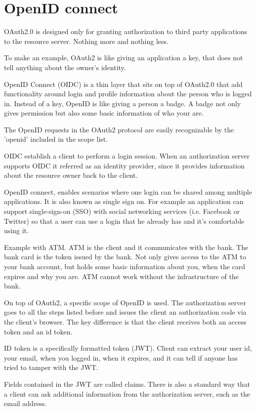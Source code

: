 \documentclass[11pt]{style}
\begin{document}
\section{OpenID connect}
\label{openid}
OAuth2.0 is designed only for granting authorization to third party applications
to the resource server. Nothing more and nothing less.

To make an example, OAuth2 is like giving an application a key, that does not
tell anything about the owner's identity.

OpenID Connect (OIDC) is a thin layer that sits on top of OAuth2.0 that add functionality around
login and profile information about the person who is logged in.
Instead of a key, OpenID is like giving a person a badge. A badge not only gives
permission but also some basic information of who your are.

The OpenID requests in the OAuth2 protocol are easily recognizable by the
'openid' included in the scope list.

OIDC establish a client to perform a login session.
When an authorization server supports OIDC it referred as an identity provider,
since it provides information about the resource owner back to the client.

OpenID connect, enables scenarios where one login can be shared among multiple
applications. It is also known as single sign on.
For example an application can support single-sign-on (SSO) with social networking services (i.e.
Facebook or Twitter) so that a user can use a login that he already has and it's
comfortable using it.

Example with ATM. ATM is the client and it communicates with the bank. The bank
card is the token issued by the bank. Not only gives access to the ATM to your
bank account, but holds some basic information about you, when the card expires
and why you are.
ATM cannot work without the infrastructure of the bank.

On top of OAuth2, a specific scope of OpenID is used. The authorization server
goes to all the steps listed before and issues the client an authorization code
via the client's browser.
The key difference is that the client receives both an access token and an id
token.

ID token is a specifically formatted token (JWT). Client can extract your user
id, your email, when you logged in, when it expires, and it can tell if anyone
has tried to tamper with the JWT.

Fields contained in the JWT are called claims.
There is also a standard way that a client can ask additional information from the
authorization server, such as the email address.
\end{document}
